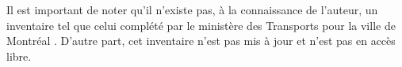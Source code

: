   Il est important de noter qu'il n'existe pas, à la connaissance de l'auteur, un inventaire tel que celui complété par le ministère des Transports pour la ville de Montréal \parencite{consortium_cima_-_daniel_arbour_et_associes_inventaire_1998}. D'autre part, cet inventaire n'est pas mis à jour et n'est pas en accès libre.